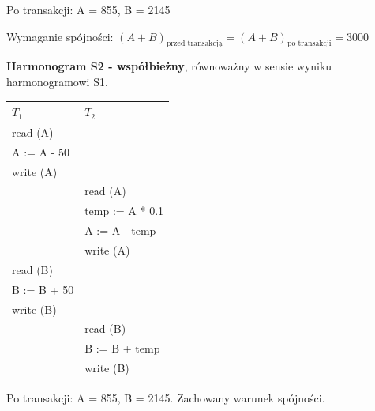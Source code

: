 \documentclass[12pt]{article}
\begin{document}
    Po transakcji: A = 855, B = 2145

    Wymaganie spójności:
    $( A + B )_{\text{przed transakcją}} = ( A + B )_{\text{po transakcji}} = 3000$\\

    \newpage

    \noindent \textbf{Harmonogram S2 - współbieżny}, równoważny w sensie wyniku harmonogramowi S1.
    \begin{table}[H]
        \begin{center}
            \begin{tabular}{| p{6cm} | p{6cm} |}
                \hline
                $T_1$ & $T_2$\\
                \hline
                \hline
                read (A) &\\
                \hline
                A := A - 50 &\\
                \hline
                write (A) &\\
                \hline
                & read (A)\\
                \hline
                & temp := A * 0.1\\
                \hline
                & A := A - temp\\
                \hline
                & write (A)\\
                \hline
                read (B) &\\
                \hline
                B := B + 50 &\\
                \hline
                write (B) &\\
                \hline
                & read (B)\\
                \hline
                & B := B + temp\\
                \hline
                & write (B)\\
                \hline
            \end{tabular}
        \end{center}
    \end{table}

    Po transakcji: A = 855, B = 2145. Zachowany warunek spójności.\\
\end{document}
